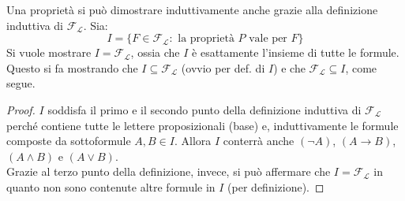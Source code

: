 Una proprietà si può dimostrare induttivamente anche grazie alla definizione  induttiva di $\mathscr{F_L}$. Sia:
$$
I = \{ F \in \mathscr{F_L} : \text{ la proprietà } P \text{ vale per } F\}
$$
Si vuole mostrare $I = \mathscr{F_L}$, ossia che $I$ è esattamente l'insieme di tutte le formule. Questo si fa mostrando che $I \subseteq \mathscr{F_L}$ (ovvio per def. di $I$) e che $\mathscr{F_L} \subseteq I$, come segue.
\begin{proof}
$I$ soddisfa il primo e il secondo punto della definizione induttiva di $\mathscr{F_L}$ perché contiene tutte le lettere proposizionali (base) e, induttivamente le formule composte da sottoformule $A,B \in I$. Allora $I$ conterrà anche $(\neg A)$, $(A \rightarrow B)$, $(A \land B)$ e $(A \lor B)$. \\
Grazie al terzo punto della definizione, invece, si può affermare che $I = \mathscr{F_L}$ in quanto non sono contenute altre formule in $I$ (per definizione).
\end{proof}

